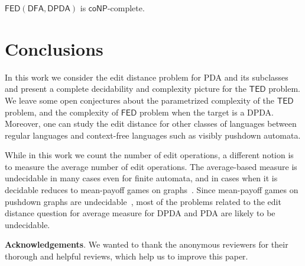 \documentclass{CSML}
\newcommand{\coNP}{\textsf{coNP}}
\newcommand{\DFA}{\mathsf{DFA}}
\newcommand{\DPDA}{\mathsf{DPDA}}
\newcommand{\TED}{\mathsf{TED}}
\newcommand{\FED}{\mathsf{FED}}
\begin{document}
\begin{conj}
$\FED(\DFA,\DPDA)$ is $\coNP$-complete.
\label{conj:FEDisUndec}
\end{conj}

 

\section{Conclusions}
In this work we consider the edit distance problem for PDA and its subclasses
and present a complete decidability and complexity picture for the $\TED$ problem.
We leave some open conjectures about the parametrized complexity of the $\TED$
problem, and the complexity of $\FED$ problem when the target is a DPDA.
Moreover, one can study the edit distance for other classes of languages between 
regular languages and context-free languages such as visibly pushdown automata.

While in this work we count the number of edit operations, a different notion is
to measure the average number of edit operations. 
The average-based measure is undecidable in many cases even for finite automata,
and in cases when it is decidable reduces to mean-payoff games on graphs~\cite{limavgRiveros}.
Since mean-payoff games on pushdown graphs are undecidable~\cite{CV12}, most of the problems 
related to the edit distance question for average measure for DPDA and PDA are likely
to be undecidable.


\noindent\textbf{Acknowledgements}. We wanted to thank the anonymous reviewers for their thorough and helpful
reviews, which help us to improve this paper.



\end{document}
